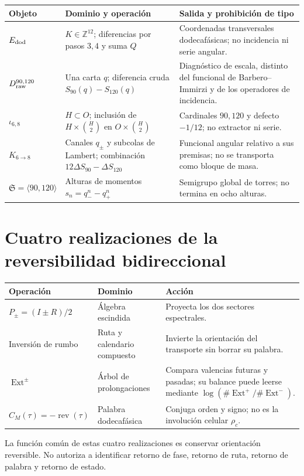 \begin{longtable}{@{}
>{\raggedright\arraybackslash}p{}
>{\raggedright\arraybackslash}p{}
>{\raggedright\arraybackslash}p{}@{}}
\toprule
Objeto & Dominio y operación & Salida y prohibición de tipo \\ \midrule
\endhead
\(\mathcal E_{\rm dod}\)&\(K\in\mathbb Z^{12}\); diferencias por pasos
\(3,4\) y suma \(Q\)&Coordenadas transversales dodecafásicas; no incidencia
ni serie angular.\\
\(D_{\rm raw}^{90,120}\)&Una carta \(q\); diferencia cruda
\(S_{90}(q)-S_{120}(q)\)&Diagnóstico de escala, distinto del funcional de
Barbero--Immirzi y de los operadores de incidencia.\\
\(\iota_{6,8}\)&\(H\subset O\); inclusión de
\(H\times\binom{H}{2}\) en \(O\times\binom{H}{2}\)&Cardinales \(90,120\) y
defecto \(-1/12\); no extractor ni serie.\\
\(K_{6\to8}\)&Canales \(q_\pm\) y subcolas de Lambert; combinación
\(12\Delta S_{90}-\Delta S_{120}\)&Funcional angular relativo a sus
premisas; no se transporta como bloque de masa.\\
\(\mathfrak S=\langle90,120\rangle\)&Alturas de momentos
\(s_n=q_-^n-q_+^n\)&Semigrupo global de torres; no termina en ocho alturas.\\
\bottomrule
\end{longtable}

\section*{Cuatro realizaciones de la reversibilidad bidireccional}

\begin{longtable}{@{}
  >{\raggedright\arraybackslash}p{}
  >{\raggedright\arraybackslash}p{}
  >{\raggedright\arraybackslash}p{}@{}}
\toprule
Operación & Dominio & Acción \\ \midrule
\endhead
\(P_\pm=(I\pm R)/2\)&Álgebra escindida&Proyecta los dos sectores
espectrales.\\
Inversión de rumbo&Ruta y calendario compuesto&Invierte la orientación del
transporte sin borrar su palabra.\\
\(\operatorname{Ext}^{\pm}\)&Árbol de prolongaciones&Compara valencias
futuras y pasadas; su balance puede leerse mediante
\(\log(\#\operatorname{Ext}^+/\#\operatorname{Ext}^-)\).\\
\(C_M(\tau)=-\operatorname{rev}(\tau)\)&Palabra dodecafásica&Conjuga orden
y signo; no es la involución celular \(\rho_c\).\\
\bottomrule
\end{longtable}

La función común de estas cuatro realizaciones es conservar orientación
reversible. No autoriza a identificar retorno de fase, retorno de ruta,
retorno de palabra y retorno de estado.
